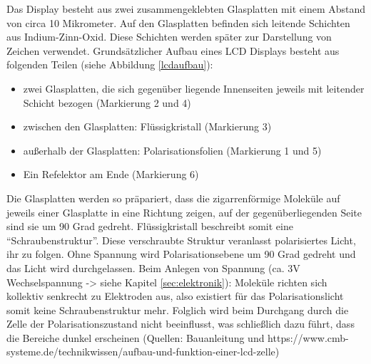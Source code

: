 Das Display besteht aus zwei zusammengeklebten Glasplatten mit einem Abstand von circa 10 Mikrometer. Auf den Glasplatten befinden sich leitende Schichten aus Indium-Zinn-Oxid. Diese Schichten werden später zur Darstellung von Zeichen verwendet. Grundsätzlicher Aufbau eines LCD Displays besteht aus folgenden Teilen (siehe Abbildung \ref{lcdaufbau}):
\begin{itemize}
\item zwei Glasplatten, die sich gegenüber liegende Innenseiten jeweils mit leitender Schicht bezogen (Markierung 2 und 4)
\item zwischen den Glasplatten: Flüssigkristall (Markierung 3)
\item außerhalb der Glasplatten: Polarisationsfolien (Markierung 1 und 5)
\item Ein Refelektor am Ende (Markierung 6)
\end{itemize}
Die Glasplatten werden so präpariert, dass die zigarrenförmige Moleküle auf jeweils einer Glasplatte in eine Richtung zeigen, auf der gegenüberliegenden Seite sind sie um 90 Grad gedreht. Flüssigkristall beschreibt somit eine “Schraubenstruktur”. Diese verschraubte Struktur veranlasst polarisiertes Licht, ihr zu folgen. Ohne Spannung wird Polarisationsebene um 90 Grad gedreht  und das Licht wird durchgelassen. Beim Anlegen von Spannung (ca. 3V Wechselspannung -> siehe Kapitel \ref{sec:elektronik}): Moleküle richten sich kollektiv senkrecht zu Elektroden aus, also existiert für das Polarisationslicht somit keine Schraubenstruktur mehr. Folglich wird beim Durchgang durch die Zelle der Polarisationszustand nicht beeinflusst, was schließlich dazu führt, dass die Bereiche dunkel erscheinen (Quellen: Bauanleitung und https://www.cmb-systeme.de/technikwissen/aufbau-und-funktion-einer-lcd-zelle)



